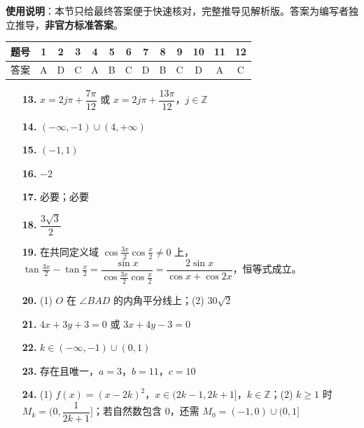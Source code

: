 
\begin{gknotice}
\textbf{使用说明}：本节只给最终答案便于快速核对，完整推导见解析版。答案为编写者独立推导，\textbf{非官方标准答案}。
\end{gknotice}

\begin{center}\begin{tabular}{ccccccccccccc}
\toprule
题号 & 1 & 2 & 3 & 4 & 5 & 6 & 7 & 8 & 9 & 10 & 11 & 12 \\
\midrule
答案 & A & D & C & A & B & C & D & B & C & D & A & C \\
\bottomrule
\end{tabular}\end{center}

\begin{itemize}[leftmargin=2.6em]
  \item[\textbf{13.}] $x=2j\pi+\dfrac{7\pi}{12}$ 或 $x=2j\pi+\dfrac{13\pi}{12}$，$j\in\mathbb Z$
  \item[\textbf{14.}] $(-\infty,-1)\cup(4,+\infty)$
  \item[\textbf{15.}] $(-1,1)$
  \item[\textbf{16.}] $-2$
  \item[\textbf{17.}] 必要；必要
  \item[\textbf{18.}] $\dfrac{3\sqrt3}{2}$
\end{itemize}

\begin{itemize}[leftmargin=2.6em]
  \item[\textbf{19.}] 在共同定义域 $\cos\frac{3x}{2}\cos\frac{x}{2}\ne0$ 上，$\tan\frac{3x}{2}-\tan\frac{x}{2}=\dfrac{\sin x}{\cos\frac{3x}{2}\cos\frac{x}{2}}=\dfrac{2\sin x}{\cos x+\cos2x}$，恒等式成立。
  \item[\textbf{20.}] (1) $O$ 在 $\angle BAD$ 的内角平分线上；(2) $30\sqrt2$
  \item[\textbf{21.}] $4x+3y+3=0$ 或 $3x+4y-3=0$
  \item[\textbf{22.}] $k\in(-\infty,-1)\cup(0,1)$
  \item[\textbf{23.}] 存在且唯一，$a=3$，$b=11$，$c=10$
  \item[\textbf{24.}] (1) $f(x)=(x-2k)^2$，$x\in(2k-1,2k+1]$，$k\in\mathbb Z$；(2) $k\ge1$ 时 $M_k=(0,\dfrac1{2k+1}]$；若自然数包含 $0$，还需 $M_0=(-1,0)\cup(0,1]$
\end{itemize}
